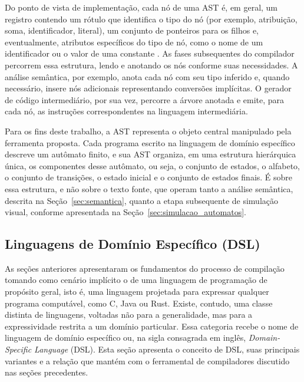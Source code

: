 \documentclass[
    12pt
    ,oneside
    ,a4paper
    ,chapter=TITLE
    ,section=TITLE
    ,sumario=abnt-6027-2012]{abntex2}
\begin{document}
Do ponto de vista de implementação, cada nó de uma AST é, em geral, um registro contendo um
rótulo que identifica o tipo do nó (por exemplo, atribuição, soma, identificador, literal),
um conjunto de ponteiros para os filhos e, eventualmente, atributos específicos do tipo de nó,
como o nome de um identificador ou o valor de uma constante \cite{aho2008}. As fases
subsequentes do compilador percorrem essa estrutura, lendo e anotando os nós conforme suas
necessidades. A análise semântica, por exemplo, anota cada nó com seu tipo inferido e, quando
necessário, insere nós adicionais representando conversões implícitas. O gerador de código
intermediário, por sua vez, percorre a árvore anotada e emite, para cada nó, as instruções
correspondentes na linguagem intermediária.

Para os fins deste trabalho, a AST representa o objeto central manipulado pela ferramenta
proposta. Cada programa escrito na linguagem de domínio específico descreve um autômato finito,
e sua AST organiza, em uma estrutura hierárquica única, os componentes desse autômato, ou seja,
o conjunto de estados, o alfabeto, o conjunto de transições, o estado inicial e o conjunto de
estados finais. É sobre essa estrutura, e não sobre o texto fonte, que operam tanto a análise
semântica, descrita na Seção~\ref{sec:semantica}, quanto a etapa subsequente de simulação
visual, conforme apresentada na Seção~\ref{sec:simulacao_automatos}.

\subsection{Linguagens de Domínio Específico (DSL)}
\label{sec:dsl}

As seções anteriores apresentaram os fundamentos do processo de compilação tomando como cenário
implícito o de uma linguagem de programação de propósito geral, isto é, uma linguagem projetada
para expressar qualquer programa computável, como C, Java ou Rust. Existe, contudo, uma classe
distinta de linguagens, voltadas não para a generalidade, mas para a expressividade restrita a
um domínio particular. Essa categoria recebe o nome de linguagem de domínio específico
ou, na sigla consagrada em inglês, \textit{Domain-Specific Language} (DSL). Esta seção apresenta
o conceito de DSL, suas principais variantes e a relação que mantém com o ferramental de
compiladores discutido nas seções precedentes.
\end{document}

